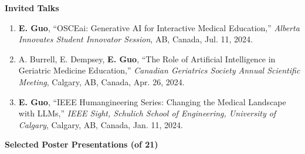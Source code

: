 \documentclass{article}
\begin{document}
\textbf{Invited Talks} \vspace{.5em}

\begin{enumerate}
    \item \textbf{E. Guo}, ``OSCEai: Generative AI for Interactive Medical Education,'' \textit{Alberta Innovates Student Innovator Session}, AB, Canada, Jul. 11, 2024.
    \item A. Burrell, E. Dempsey, \textbf{E. Guo}, ``The Role of Artificial Intelligence in Geriatric Medicine Education,'' \textit{Canadian Geriatrics Society Annual Scientific Meeting}, Calgary, AB, Canada, Apr. 26, 2024.
    \item \textbf{E. Guo}, ``IEEE Humangineering Series: Changing the Medical Landscape with LLMs,'' \textit{IEEE Sight, Schulich School of Engineering, University of Calgary}, Calgary, AB, Canada, Jan. 11, 2024.
\end{enumerate} \vspace{1em}

\textbf{Selected Poster Presentations \normalfont (of 21)} \vspace{.5em}
\end{document}
